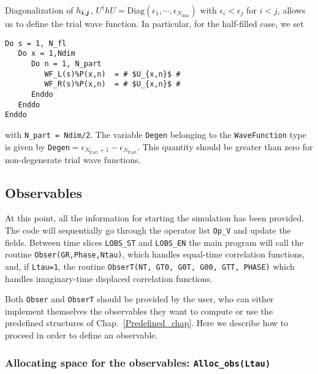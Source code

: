 Diagonalization  of  $ h_{\boldsymbol{i},\boldsymbol{j}}$,      $U^{\dagger} h  U  = \mathrm{Diag} \left(   \epsilon_1, \cdots, \epsilon_{N_{\mathrm{dim}}} \right) $     with  $\epsilon_i  <  \epsilon_j $  for $i < j$, allows us  to define the  trial wave function.  In particular, for the half-filled case, we set 
\begin{lstlisting}[style=fortran,escapechar=\#]
Do s = 1, N_fl
   Do x = 1,Ndim
      Do n = 1, N_part
         WF_L(s)%P(x,n)  = # $U_{x,n}$ #
         WF_R(s)%P(x,n)  = # $U_{x,n}$ #
      Enddo
   Enddo
Enddo
\end{lstlisting}
with \texttt{N\_part = Ndim/2}.     The  variable \texttt{Degen}   belonging to the \texttt{WaveFunction}  type  is given by  \texttt{Degen}$=\epsilon_{N_{\mathrm{Part}} +1 } - \epsilon_{N_{\mathrm{Part}}  }$.   This quantity should be greater than zero  for non-degenerate trial wave functions. 

\subsection{Observables}

At this point, all the information for starting the simulation has been provided.  The code will sequentially go through  the operator list  \texttt{Op\_V}  and update the  fields.  Between  time slices  \texttt{LOBS\_ST}  and  \texttt{LOBS\_EN} the main program will call the routine  \texttt{Obser(GR,Phase,Ntau)}, which handles equal-time correlation functions, and, if \texttt{Ltau=1}, the routine \texttt{ObserT(NT,  GT0, G0T, G00, GTT, PHASE)} which handles imaginary-time displaced correlation functions. 

Both \texttt{Obser} and \texttt{ObserT} should be provided by the user, who can either implement themselves the observables they want to compute or use the predefined structures of Chap.~\ref{Predefined_chap}. Here we describe how to proceed in order to define an observable. 

\subsubsection[Allocating space for the observables: \texttt{Alloc\_obs}]{Allocating space for the observables: \texttt{Alloc\_obs(Ltau)}} \label{Alloc_obs_sec}

